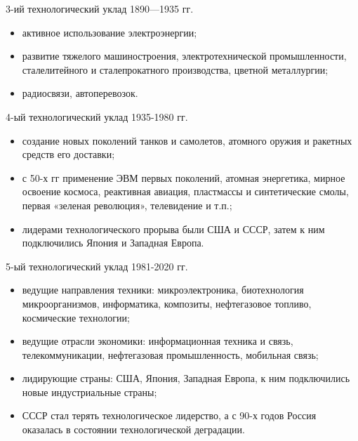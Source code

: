 \documentclass[_Venture_p1.tex]{subfiles}
\begin{document}
\begin{frame}{3-ий технологический уклад 1890—1935 гг.}
\begin{itemize}
	\item активное использование электроэнергии; 
	\item развитие тяжелого машиностроения, электротехнической промышленности, сталелитейного и сталепрокатного производства, цветной металлургии; 
	\item радиосвязи, автоперевозок. 
\end{itemize}
\end{frame}

\begin{frame}{4-ый технологический уклад 1935-1980 гг.}
\begin{itemize}
	\item создание новых поколений танков и самолетов, атомного оружия и ракетных средств его доставки; 
	\item с 50-х гг применение ЭВМ первых поколений, атомная энергетика, мирное освоение космоса, реактивная авиация, пластмассы и синтетические смолы, первая «зеленая революция», телевидение и т.п.; 
	\item лидерами технологического прорыва были США и СССР, затем к ним подключились Япония и Западная Европа.
\end{itemize}
\end{frame}

\begin{frame}{5-ый технологический уклад 1981-2020 гг.}
\begin{itemize}
	\small
	\item ведущие направления техники: микроэлектроника, биотехнология микроорганизмов, информатика, композиты, нефтегазовое топливо, космические технологии; 
	\item ведущие отрасли экономики: информационная техника и связь, телекоммуникации, нефтегазовая промышленность, мобильная связь;
	\item лидирующие страны: США, Япония, Западная Европа, к ним подключились новые индустриальные страны; 
	\item СССР стал терять технологическое лидерство, а с 90-х годов Россия оказалась в состоянии технологической деградации.
\end{itemize}
\end{frame}
\end{document}
